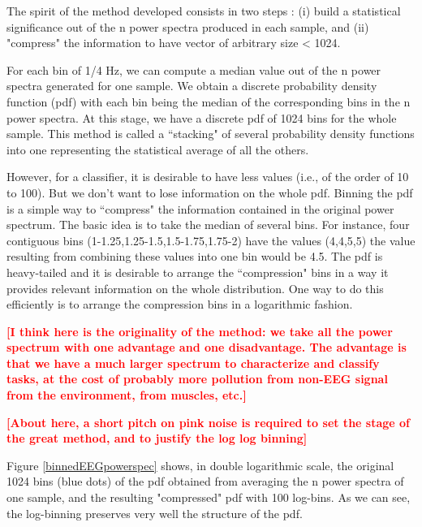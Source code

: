 The spirit of the method developed consists in two steps : (i) build a statistical significance out of the n power spectra produced in each sample, and (ii) "compress" the information to have vector of arbitrary size < 1024.

For each bin of 1/4 Hz, we can compute a median value out of the n power spectra generated for one sample.  We obtain a discrete probability density function (pdf) with each bin being the median of the corresponding bins in the n power spectra. At this stage, we have a discrete pdf of 1024 bins for the whole sample. This method is called a ``stacking" of several probability density functions into one representing the statistical average of all the others.

However, for a classifier, it is desirable to have less values (i.e., of the order of 10 to 100). But we don't want to lose information on the whole pdf. Binning the pdf is a simple way to ``compress" the information contained in the original power spectrum. The basic idea is to take the median of several bins. For instance, four contiguous bins (1-1.25,1.25-1.5,1.5-1.75,1.75-2) have the values (4,4,5,5) the value resulting from combining these values into one bin would be 4.5. The pdf is heavy-tailed and it is desirable to arrange the ``compression" bins in a way it provides relevant information on the whole distribution. One way to do this efficiently is to arrange the compression bins in a logarithmic fashion.

\textcolor{red}{\bf [I think here is the originality of the method: we take all the power spectrum with one advantage and one disadvantage. The advantage is that we have a much larger spectrum to characterize and classify tasks, at the cost of probably more pollution from non-EEG signal from the environment, from muscles, etc.]}


\textcolor{red}{\bf [About here, a short pitch on pink noise is required to set the stage of the great method, and to justify the log log binning]}

Figure \ref{binnedEEGpowerspec} shows, in double logarithmic scale, the original 1024 bins (blue dots) of the pdf obtained from averaging the n power spectra of one sample, and the resulting "compressed"  pdf with 100 log-bins. As we can see, the log-binning preserves very well the structure of the pdf.

